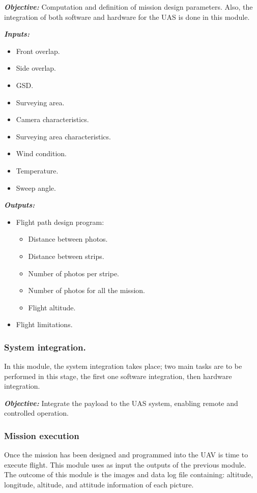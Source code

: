 \textit{\textbf{Objective:}} Computation and definition of mission design parameters. Also, the integration of both software and hardware for the UAS is done in this module.

\textit{\textbf{Inputs:}} 
\begin{itemize}
    \item Front overlap.
    \item Side overlap.
    \item GSD.
    \item Surveying area.
    \item Camera characteristics.
    \item Surveying area characteristics.
    \item Wind condition.
    \item Temperature.
    \item Sweep angle.
\end{itemize}

\textit{\textbf{Outputs:}} 
\begin{itemize}
    \item Flight path design program:\begin{itemize}
        \item Distance between photos.
        \item Distance between strips.
        \item Number of photos per stripe.
        \item Number of photos for all the mission.
        \item Flight altitude.
    \end{itemize}
    \item Flight limitations.
\end{itemize}
\subsubsection{System integration.}
In this module, the system integration takes place; two main tasks are to be performed in this stage, the first one software integration, then hardware integration.


\textit{\textbf{Objective:}} Integrate the payload to the UAS system, enabling remote and controlled operation.

\subsubsection{Mission execution}
Once the mission has been designed and programmed into the UAV is time to execute flight. This module uses as input the outputs of the previous module. The outcome of this module is the images and data log file containing: altitude, longitude, altitude, and attitude information of each picture.

